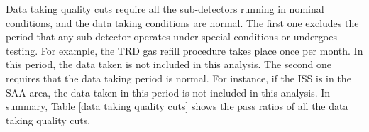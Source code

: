 Data taking quality cuts require all the sub-detectors running in nominal conditions, and the data taking conditions are normal. The first one excludes the period that any sub-detector operates under special conditions or undergoes testing. For example, the TRD gas refill procedure takes place once per month. In this period, the data taken is not included in this analysis. The second one requires that the data taking period is normal. For instance, if the ISS is in the SAA area, the data taken in this period is not included in this analysis. In summary, Table \ref{data taking quality cuts} shows the pass ratios of all the data taking quality cuts. \par


